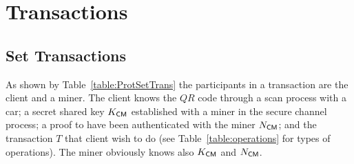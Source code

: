 \section{Transactions}




\subsection{Set Transactions} 
\label{ssec:setTrans}

As shown by Table~\ref{table:ProtSetTrans} the participants in a transaction 
are the client and a miner.
The client knows the $QR$ code through a scan process with
a car; a secret shared key $K_{\textsf{C}\textsf{M}}$ established with
a miner in the secure channel process; a proof to have been authenticated
with the miner $N_{\textsf{C}\textsf{M}}$; and the transaction $T$ that client wish 
to do  (see Table~\ref{table:operations} for types of operations). 
The miner obviously knows also $K_{\textsf{C}\textsf{M}}$ and $N_{\textsf{C}\textsf{M}}$. 
